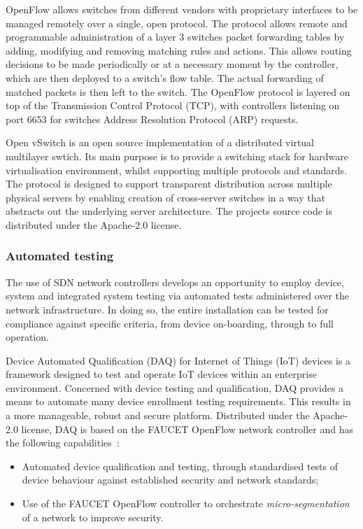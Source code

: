 \documentclass[11pt, oneside]{book}   	%
\begin{document}
OpenFlow allows switches from different vendors with proprietary interfaces to be managed remotely over a single, open protocol.
The protocol allows remote and programmable administration of a layer 3 switches packet forwarding tables by adding, modifying and removing matching rules and actions.
This allows routing decisions to be made periodically or at a necessary moment by the controller, which are then deployed to a switch's flow table.
The actual forwarding of matched packets is then left to the switch.
The OpenFlow protocol is layered on top of the Transmission Control Protocol (TCP), with controllers listening on port 6653 for switches Address Resolution Protocol (ARP) requests.\

Open vSwitch is an open source implementation of a distributed virtual multilayer swtich.
Its main purpose is to provide a switching stack for hardware virtualisation environment, whilst supporting multiple protocols and standards.
The protocol is designed to support transparent distribution across multiple physical servers by enabling creation of cross-server switches in a way that abstracts out the underlying server architecture.
The projects source code is distributed under the Apache-2.0 license.

\subsubsection{Automated testing}
The use of SDN network controllers develops an opportunity to employ device, system and integrated system testing via automated tests administered over the network infrastructure.
In doing so, the entire installation can be tested for compliance against specific criteria, from device on-boarding, through to full operation.

Device Automated Qualification (DAQ) for Internet of Things (IoT) devices is a framework designed to test and operate IoT devices within an enterprise environment.
Concerned with device testing and qualification, DAQ provides a means to automate many device enrollment testing requirements.
This results in a more manageable, robust and secure platform.
Distributed under the Apache-2.0 license, DAQ is based on the FAUCET OpenFlow network controller and has the following capabilities~\cite{daq1}:
\begin{itemize}
	\item Automated device qualification and testing, through standardised tests of device behaviour against established security and network standards; 
	\item Use of the FAUCET OpenFlow controller to orchestrate \emph{micro-segmentation} of a network to improve security.
\end{itemize}\
\end{document}
